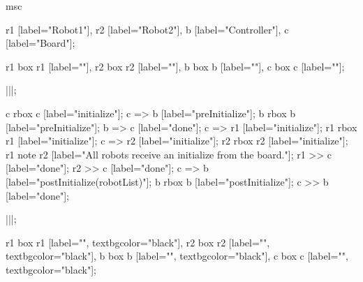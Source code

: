 \begin{msc}
msc
{

r1 [label="Robot1"],
r2 [label="Robot2"],
b [label="Controller"],
c [label="Board"];

r1 box r1 [label=""],
r2 box r2 [label=""],
b box b [label=""],
c box c [label=""];

|||;

c rbox c [label="initialize"];
c => b [label="preInitialize"];
b rbox b [label="preInitialize"];
b => c [label="done"];
c => r1 [label="initialize"];
r1 rbox r1 [label="initialize"];
c => r2 [label="initialize"];
r2 rbox r2 [label="initialize"];
r1 note r2 [label="All robots receive an initialize from the board."];
r1 >> c [label="done"];
r2 >> c [label="done"];
c => b [label="postInitialize(robotList)"];
b rbox b [label="postInitialize"];
c >> b [label="done"];

|||;

r1 box r1 [label="", textbgcolor="black"],
r2 box r2 [label="", textbgcolor="black"],
b box b [label="", textbgcolor="black"],
c box c [label="", textbgcolor="black"];

}
\end{msc}
